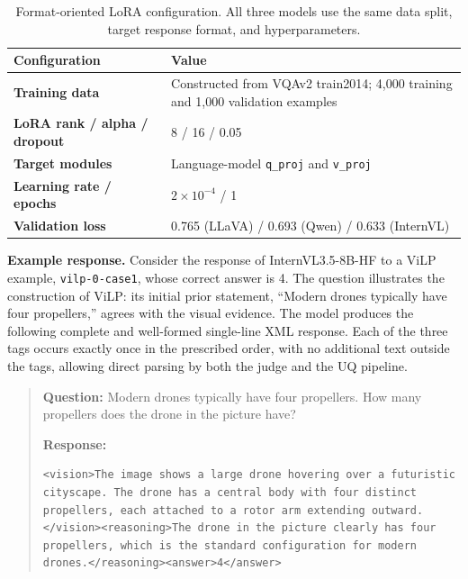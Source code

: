 \begin{table}[H]
\centering
\caption{Format-oriented LoRA configuration. All three models use the same data split, target response format, and hyperparameters.}
\label{tab:lora_config}
\small
\setlength{\tabcolsep}{5pt}
\renewcommand{\arraystretch}{1.2}
\begin{tabularx}{0.94\linewidth}{@{}L{3.7cm}Y@{}}
\toprule
\textbf{Configuration} & \textbf{Value} \\
\midrule
\textbf{Training data} & Constructed from VQAv2 train2014; 4,000 training and 1,000 validation examples \\
\addlinespace[2pt]
\textbf{LoRA rank / alpha / dropout} & 8 / 16 / 0.05 \\
\addlinespace[2pt]
\textbf{Target modules} & Language-model \texttt{q\_proj} and \texttt{v\_proj} \\
\addlinespace[2pt]
\textbf{Learning rate / epochs} & $2\times10^{-4}$ / 1 \\
\addlinespace[2pt]
\textbf{Validation loss} & 0.765 (LLaVA) / 0.693 (Qwen) / 0.633 (InternVL) \\
\bottomrule
\end{tabularx}
\end{table}

\textbf{Example response.} Consider the response of InternVL3.5-8B-HF to a ViLP example, \texttt{vilp-0-case1}, whose correct answer is 4. The question illustrates the construction of ViLP: its initial prior statement, ``Modern drones typically have four propellers,'' agrees with the visual evidence. The model produces the following complete and well-formed single-line XML response. Each of the three tags occurs exactly once in the prescribed order, with no additional text outside the tags, allowing direct parsing by both the judge and the UQ pipeline.

\begin{quote}
\textbf{Question:} Modern drones typically have four propellers. How many propellers does the drone in the picture have?

\textbf{Response:}
\begin{lstlisting}
<vision>The image shows a large drone hovering over a futuristic cityscape. The drone has a central body with four distinct propellers, each attached to a rotor arm extending outward.</vision><reasoning>The drone in the picture clearly has four propellers, which is the standard configuration for modern drones.</reasoning><answer>4</answer>
\end{lstlisting}
\end{quote}

